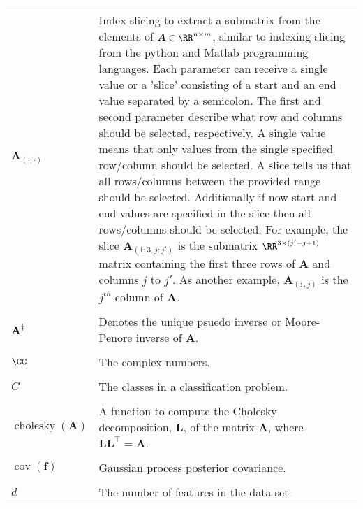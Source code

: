 \begin{longtable}{lp{}}
    \\\\
    $\bm{A}_{(\cdot,\cdot)}$                                                                                   & Index slicing to extract a submatrix from the elements of $\bm{A} \in \RR^{n \times m}$, similar to indexing slicing from the python and Matlab programming languages. Each parameter can receive a single value or a 'slice' consisting of a start and an end value separated by a semicolon. The first and second parameter describe what row and columns should be selected, respectively. A single value means that only values from the single specified row/column should be selected. A slice tells us that all rows/columns between the provided range should be selected. Additionally if now start and end values are specified in the slice then all rows/columns should be selected. For example, the slice $\bm{A}_{(1:3,j:j')}$ is the submatrix $\RR^{3 \times (j' - j + 1)}$ matrix containing the first three rows of $\bm{A}$ and columns $j$ to $j'$. As another example, $\bm{A}_{(:,j)}$ is the $j^{th}$ column of $\bm{A}$.
    \\\\
    $\bm{A}^{\dagger}$                                                                                         & Denotes the unique psuedo inverse or Moore-Penore inverse of $\bm{A}$.
    \\\\
    $\CC$                                                                                                      & The complex numbers.
    \\\\
    $C$                                                                                                        & The classes in a classification problem.
    \\\\
    $\operatorname{cholesky} \left( \bm{A} \right)$                                                            & A function to compute the Cholesky decomposition, $\bm{L}$, of the matrix $\bm{A}$, where $\bm{L} \bm{L}^{\intercal} = \bm{A}$.
    \\\\
    $\operatorname{cov} \left( \bm{f} \right)$                                                                 & Gaussian process posterior covariance.
    \\\\
    $d$                                                                                                        & The number of features in the data set.

\end{longtable}
